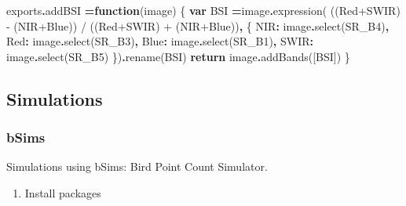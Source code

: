 \documentclass[
]{article}
\newenvironment{Shaded}{\begin{snugshade}}{\end{snugshade}}
\newcommand{\AttributeTok}[1]{\textcolor[rgb]{0.77,0.63,0.00}{#1}}
\newcommand{\ControlFlowTok}[1]{\textcolor[rgb]{0.13,0.29,0.53}{\textbf{#1}}}
\newcommand{\FunctionTok}[1]{\textcolor[rgb]{0.00,0.00,0.00}{#1}}
\newcommand{\KeywordTok}[1]{\textcolor[rgb]{0.13,0.29,0.53}{\textbf{#1}}}
\newcommand{\NormalTok}[1]{#1}
\newcommand{\OperatorTok}[1]{\textcolor[rgb]{0.81,0.36,0.00}{\textbf{#1}}}
\newcommand{\StringTok}[1]{\textcolor[rgb]{0.31,0.60,0.02}{#1}}
\providecommand{\tightlist}{%
  \setlength{\itemsep}{0pt}\setlength{\parskip}{0pt}}
\begin{document}
\begin{Shaded}
\begin{Highlighting}[]
\NormalTok{exports}\OperatorTok{.}\AttributeTok{addBSI} \OperatorTok{=}\KeywordTok{function}\NormalTok{(image) \{}
  \KeywordTok{var}\NormalTok{ BSI }\OperatorTok{=}\NormalTok{image}\OperatorTok{.}\FunctionTok{expression}\NormalTok{(}
        \StringTok{\textquotesingle{}((Red+SWIR) {-} (NIR+Blue)) / ((Red+SWIR) + (NIR+Blue))\textquotesingle{}}\OperatorTok{,}\NormalTok{ \{}
          \StringTok{\textquotesingle{}NIR\textquotesingle{}}\OperatorTok{:}\NormalTok{ image}\OperatorTok{.}\FunctionTok{select}\NormalTok{(}\StringTok{\textquotesingle{}SR\_B4\textquotesingle{}}\NormalTok{)}\OperatorTok{,}
          \StringTok{\textquotesingle{}Red\textquotesingle{}}\OperatorTok{:}\NormalTok{ image}\OperatorTok{.}\FunctionTok{select}\NormalTok{(}\StringTok{\textquotesingle{}SR\_B3\textquotesingle{}}\NormalTok{)}\OperatorTok{,}
          \StringTok{\textquotesingle{}Blue\textquotesingle{}}\OperatorTok{:}\NormalTok{ image}\OperatorTok{.}\FunctionTok{select}\NormalTok{(}\StringTok{\textquotesingle{}SR\_B1\textquotesingle{}}\NormalTok{)}\OperatorTok{,}
          \StringTok{\textquotesingle{}SWIR\textquotesingle{}}\OperatorTok{:}\NormalTok{ image}\OperatorTok{.}\FunctionTok{select}\NormalTok{(}\StringTok{\textquotesingle{}SR\_B5\textquotesingle{}}\NormalTok{) }
\NormalTok{        \})}\OperatorTok{.}\FunctionTok{rename}\NormalTok{(}\StringTok{\textquotesingle{}BSI\textquotesingle{}}\NormalTok{)}
    \ControlFlowTok{return}\NormalTok{ image}\OperatorTok{.}\FunctionTok{addBands}\NormalTok{([BSI])}
\NormalTok{\}}
\end{Highlighting}
\end{Shaded}

\hypertarget{simulations}{%
\subsection{Simulations}\label{simulations}}

\hypertarget{bsims}{%
\subsubsection{bSims}\label{bsims}}

Simulations using bSims: Bird Point Count Simulator.

\begin{enumerate}
\def\labelenumi{\arabic{enumi}.}
\tightlist
\item
  Install packages
\end{enumerate}
\end{document}
